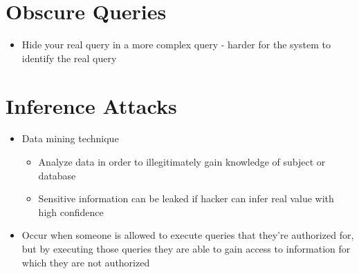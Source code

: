 \documentclass{article}[18pt]
\begin{document}
\section{Obscure Queries}
\begin{itemize}
	\item Hide your real query in a more complex query - harder for the system to identify the real query
\end{itemize}
\section{Inference Attacks}
\begin{itemize}
	\item Data mining technique
	\begin{itemize}
		\item Analyze data in order to illegitimately gain knowledge of subject or database
		\item Sensitive information can be leaked if hacker can infer real value with high confidence  
	\end{itemize}
	\item Occur when someone is allowed to execute queries that they're authorized for, but  by executing those queries they are able to gain access to information for which they are not authorized
\end{itemize}
\end{document}
